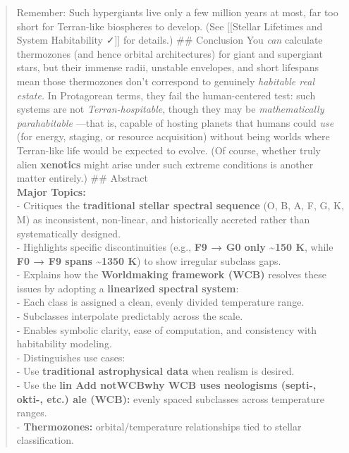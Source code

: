 \documentclass[
  letterpaper,
]{book}
\begin{document}
\begin{quote}
Remember: Such hypergiants live only a few million years at most, far
too short for Terran-like biospheres to develop. (See {[}{[}Stellar
Lifetimes and System Habitability ✓{]}{]} for details.) \#\# Conclusion
You \emph{can} calculate thermozones (and hence orbital architectures)
for giant and supergiant stars, but their immense radii, unstable
envelopes, and short lifespans mean those thermozones don't correspond
to genuinely \emph{habitable real estate.} In Protagorean terms, they
fail the human-centered test: such systems are not
\emph{Terran-hospitable}, though they may be \emph{mathematically
parahabitable} ---that is, capable of hosting planets that humans could
\emph{use} (for energy, staging, or resource acquisition) without being
worlds where Terran-like life would be expected to evolve. (Of course,
whether truly alien \textbf{xenotics} might arise under such extreme
conditions is another matter entirely.) \#\# Abstract\\
\textbf{Major Topics:}\\
- Critiques the \textbf{traditional stellar spectral sequence} (O, B, A,
F, G, K, M) as inconsistent, non-linear, and historically accreted
rather than systematically designed.\\
- Highlights specific discontinuities (e.g., \textbf{F9 → G0 only
\textasciitilde150 K}, while \textbf{F0 → F9 spans \textasciitilde1350
K}) to show irregular subclass gaps.\\
- Explains how the \textbf{Worldmaking framework (WCB)} resolves these
issues by adopting a \textbf{linearized spectral system}:\\
- Each class is assigned a clean, evenly divided temperature range.\\
- Subclasses interpolate predictably across the scale.\\
- Enables symbolic clarity, ease of computation, and consistency with
habitability modeling.\\
- Distinguishes use cases:\\
- Use \textbf{traditional astrophysical data} when realism is desired.\\
- Use the \textbf{lin Add notWCBwhy WCB uses neologisms (septi-, okti-,
etc.) ale (WCB):} evenly spaced subclasses across temperature ranges.\\
- \textbf{Thermozones:} orbital/temperature relationships tied to
stellar classification.
\end{quote}
\end{document}
